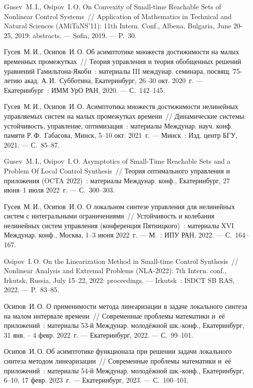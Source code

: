 \documentclass[../main.tex]{subfiles}
\begin{document}
\begin{thebibliography}{99}
Gusev~M.\,I., Osipov~I.\,O. On Convexity of Small-time Reachable Sets of Nonlinear Control Systems~// Application of Mathematics in Technical and Natural Sciences (AMiTaNS'11): 11th Intern. Conf., Albena, Bulgaria, June 20-25, 2019: abstracts. --- Sofia, 2019. --- P.~30.

Гусев~М.\,И., Осипов~И.\,О. Об асимптотике множеств достижимости на малых временных промежутках~// Теория управления и теория обобщенных решений уравнений Гамильтона-Якоби~: материалы III междунар. семинара, посвящ. 75-летию акад. А.\,И.~Субботина, Екатеринбург, 26--30 окт. 2020~г. --- Екатеринбург~: ИММ УрО РАН, 2020. --- С.~142--145.


Гусев~М.\,И., Осипов~И.\,О. Асимптотика множеств достижимости нелинейных управляемых систем на малых промежутках времени~// Динамические системы: устойчивость, управление, оптимизация~: материалы Междунар. науч. конф. памяти Р.\,Ф.~Габасова, Минск, 5--10 окт. 2021~г. --- Минск~: Изд. центр БГУ, 2021. --- С.~85--87. 

Gusev~M.\,I., Osipov~I.\,O. Asymptotics of Small-Time Reachable Sets and a Problem Of Local Control Synthesis~// Теория оптимального управления и приложения (OCTA 2022)~: материалы Междунар. конф., Екатеринбург, 27 июня–1 июля 2022~г. --- С.~300--303.

Гусев~М.\,И., Осипов~И.\,О. О локальном синтезе управления для нелинейных систем с интегральными ограничениями~// Устойчивость и колебания нелинейных систем управления (конференция Пятницкого)~: материалы XVI Междунар. конф., Москва, 1--3 июня 2022~г. --- М.~: ИПУ РАН, 2022. --- С.~164--167.

Osipov~I.\,O. On the Linearization Method in Small-time Control Synthesis~// Nonlinear Analysis and Extremal Problems (NLA-2022): 7th Intern. conf., Irkutsk, Russia, July 15–22, 2022: proceedings. --- Irkutsk~: ISDCT SB RAS, 2022. --- P.~83--85.

Осипов~И.\,О. О применимости метода линеаризации в задаче локального синтеза на малом интервале времени~// Современные проблемы математики и~её приложений~: материалы 53-й Междунар. молодёжной шк.-конф., Екатеринбург, 31 янв. -- 4 февр. 2022~г. --- Екатеринбург, 2022. --- С.~99--101.

Осипов~И.\,О. Об асимптотике функционала при решении задачи локального синтеза методом линеаризации~// Современные проблемы математики и~её приложений~: материалы 54-й Междунар. молодёжной шк.-конф., Екатеринбург, 6--10, 17 февр. 2023~г. --- Екатеринбург, 2023. --- С.~100--101.


\end{thebibliography}
\end{document}
